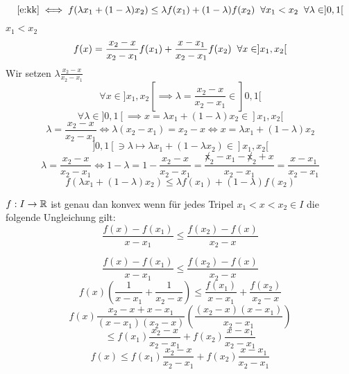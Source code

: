\begin{Lem}
  \[\ref{e:kk}\iff f(\lambda x_1+(1-\lambda)x_2)\leq\lambda f(x_1)+(1-\lambda)f(x_2)\hspace{2mm}\forall x_1 < x_2\hspace{2mm}\forall \lambda\in ]0,1[\]
\end{Lem}
\begin{Bew}
  $x_1<x_2$
  \[f(x)=\frac{x_2-x}{x_2-x_1}f(x_1)+\frac{x-x_1}{x_2-x_1}f(x_2)\hspace{2mm}\forall x\in ]x_1,x_2[\]
  Wir setzen $\lambda\frac{x_2-x}{x_2-x_1}$
  \[\forall x\in ]x_1,x_2[\implies \lambda=\frac{x_2-x}{x_2-x_1}\in ]0,1[\]
  \[\forall \lambda\in ]0,1[\implies x=\lambda x_1+(1-\lambda)x_2\in ]x_1,x_2[\]
  \[\lambda=\frac{x_2-x}{x_2-x_1}\iff \lambda(x_2-x_1)=x_2-x\iff x=\lambda x_1+(1-\lambda)x_2\]
  \[ ]0,1[\ni\lambda\mapsto \lambda x_1+(1-\lambda x_2)\in  ]x_1,x_2[\]
  \[\lambda=\frac{x_2-x}{x_2-x_1}\iff 1-\lambda=1-\frac{x_2-x}{x_2-x_1}=\frac{\not x_2-x_1-\not x_2+x}{x_2-x_1}=\frac{x-x_1}{x_2-x_1}\]
  \[f(\lambda x_1+(1-\lambda)x_2)\leq \lambda f(x_1)+(1-\lambda)f(x_2)\]
\end{Bew}
\begin{Lem}
  $f:I\to \mathbb{R}$ ist genau dan konvex wenn für jedes Tripel $x_1<x<x_2\in I$ die folgende Ungleichung gilt:
  \[\frac{f(x)-f(x_1)}{x-x_1}\leq \frac{f(x_2)-f(x)}{x_2-x}\]
\end{Lem}
\begin{Bew}
  \[\frac{f(x)-f(x_1)}{x-x_1}\leq \frac{f(x_2)-f(x)}{x_2-x}\]
  \[f(x)\left( \frac{1}{x-x_1}+\frac{1}{x_2-x} \right)\leq \frac{f(x_1)}{x-x_1}+\frac{f(x_2)}{x_2-x}\]
  \[f(x)\frac{x_2-x+x-x_1}{(x-x_1)(x_2-x)}\left( \frac{(x_2-x)(x-x_1)}{x_2-x_1} \right)\]
  \[\leq f(x_1)\frac{x_2-x}{x_2-x_1}+f(x_2)\frac{x-x_1}{x_2-x_1}\]
  \[f(x)\leq f(x_1)\frac{x_2-x}{x_2-x_1}+f(x_2)\frac{x-x_1}{x_2-x_1}\]
\end{Bew}
